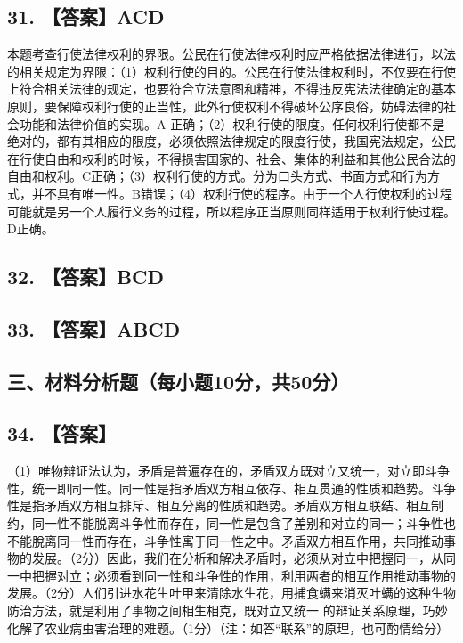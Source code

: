 \documentclass[UTF8,11pt]{ctexart}
\begin{document}
\subsection*{31. 【答案】ACD}

本题考查行使法律权利的界限。公民在行使法律权利时应严格依据法律进行，以法的相关规定为界限：（1）权利行使的目的。公民在行使法律权利时，不仅要在行使上符合相关法律的规定，也要符合立法意图和精神，不得违反宪法法律确定的基本原则，要保障权利行使的正当性，此外行使权利不得破坏公序良俗，妨碍法律的社会功能和法律价值的实现。A 正确；（2）权利行使的限度。任何权利行使都不是绝对的，都有其相应的限度，必须依照法律规定的限度行使，我国宪法规定，公民在行使自由和权利的时候，不得损害国家的、社会、集体的利益和其他公民合法的自由和权利。C正确；（3）权利行使的方式。分为口头方式、书面方式和行为方式，并不具有唯一性。B错误；（4）权利行使的程序。由于一个人行使权利的过程可能就是另一个人履行义务的过程，所以程序正当原则同样适用于权利行使过程。D正确。


\subsection*{32. 【答案】BCD}

\subsection*{33. 【答案】ABCD}

\subsection*{三、材料分析题（每小题10分，共50分）}

\subsection*{34. 【答案】}

（1）唯物辩证法认为，矛盾是普遍存在的，矛盾双方既对立又统一，对立即斗争性，统一即同一性。同一性是指矛盾双方相互依存、相互贯通的性质和趋势。斗争性是指矛盾双方相互排斥、相互分离的性质和趋势。矛盾双方相互联结、相互制约，同一性不能脱离斗争性而存在，同一性是包含了差别和对立的同一；斗争性也不能脫离同一性而存在，斗争性寓于同一性之中。矛盾双方相互作用，共同推动事物的发展。（2分）因此，我们在分析和解决矛盾时，必须从对立中把握同一，从同一中把握对立；必须看到同一性和斗争性的作用，利用两者的相互作用推动事物的发展。（2分）人们引进水花生叶甲来清除水生花，用捕食螨来消灭叶螨的这种生物防治方法，就是利用了事物之间相生相克，既对立又统一 的辩证关系原理，巧妙化解了农业病虫害治理的难题。（1分）（注：如答“联系”的原理，也可酌情给分）
\end{document}
